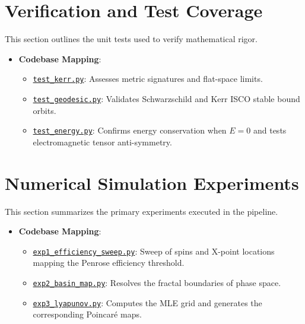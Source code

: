 \documentclass[11pt,a4paper]{article}
\begin{document}
\section{Verification and Test Coverage}
This section outlines the unit tests used to verify mathematical rigor.
\begin{itemize}
    \item \textbf{Codebase Mapping}:
    \begin{itemize}
        \item \href{file:///Users/vihaa/Desktop/grtp-kerr/tests/test_kerr.py}{\texttt{test\_kerr.py}}: Assesses metric signatures and flat-space limits.
        \item \href{file:///Users/vihaa/Desktop/grtp-kerr/tests/test_geodesic.py}{\texttt{test\_geodesic.py}}: Validates Schwarzschild and Kerr ISCO stable bound orbits.
        \item \href{file:///Users/vihaa/Desktop/grtp-kerr/tests/test_energy.py}{\texttt{test\_energy.py}}: Confirms energy conservation when $E=0$ and tests electromagnetic tensor anti-symmetry.
    \end{itemize}
\end{itemize}

\section{Numerical Simulation Experiments}
This section summarizes the primary experiments executed in the pipeline.
\begin{itemize}
    \item \textbf{Codebase Mapping}:
    \begin{itemize}
        \item \href{file:///Users/vihaa/Desktop/grtp-kerr/experiments/exp1_efficiency_sweep.py}{\texttt{exp1\_efficiency\_sweep.py}}: Sweep of spins and X-point locations mapping the Penrose efficiency threshold.
        \item \href{file:///Users/vihaa/Desktop/grtp-kerr/experiments/exp2_basin_map.py}{\texttt{exp2\_basin\_map.py}}: Resolves the fractal boundaries of phase space.
        \item \href{file:///Users/vihaa/Desktop/grtp-kerr/experiments/exp3_lyapunov.py}{\texttt{exp3\_lyapunov.py}}: Computes the MLE grid and generates the corresponding Poincaré maps.
    \end{itemize}
\end{itemize}
\end{document}
